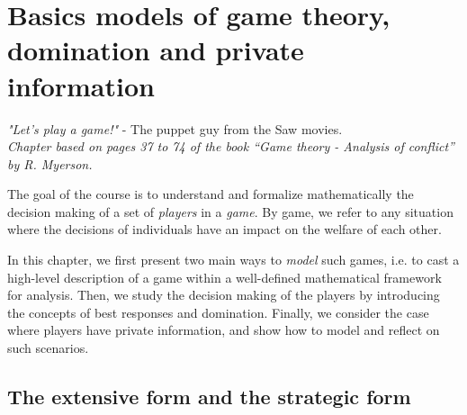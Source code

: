 \ifx \globalmark \undefined %
	
\else 	
\fi




\chapter{Basics models of game theory, domination and private information} \label{chap:Models}
{\large{\itshape
"Let's play a game!"} - The puppet guy from the Saw movies.\\
}
{\small{\itshape
Chapter based on pages 37 to 74 of the book  ``Game theory - Analysis of conflict'' by R. Myerson.}\\
}



The goal of the course is to understand and formalize mathematically the decision making of a set of 
 \emph{players} in a 
 \emph{game}. 
 By game, 
 we refer to any situation
  where the decisions 
  of individuals have an impact 
  on the welfare of each other.
 
In this chapter, 
we first present two main ways to \emph{model}
 such games, i.e. to cast a high-level description of a game within a well-defined mathematical framework for analysis.
Then, we study the decision making of the
 players by introducing the concepts of best responses
  and domination.
Finally,
 we consider the case where players have private information,
  and show how to model and reflect on such scenarios.


\section{The extensive form and the strategic form}

